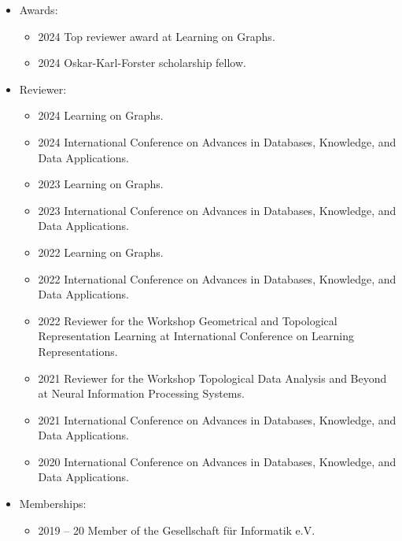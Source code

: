 \documentclass[a4paper, 11pt]{article}
\newcommand{\years}[1]{\marginnote{\scriptsize #1}}
\begin{document}
	\years{Service}
	\vspace{-10pt}
	\begin{itemize}[noitemsep, leftmargin=*]
		\item Awards:
			\begin{itemize}[noitemsep, leftmargin=*]
				\item 2024 Top reviewer award at Learning on Graphs.

				\item 2024 Oskar-Karl-Forster scholarship fellow.
			\end{itemize}

		\item Reviewer:
			\begin{itemize}[noitemsep, leftmargin=*]
				\item 2024 Learning on Graphs.

				\item 2024 International Conference on Advances in Databases, Knowledge,
					and Data Applications.

				\item 2023 Learning on Graphs.

				\item 2023 International Conference on Advances in Databases, Knowledge,
					and Data Applications.

				\item 2022 Learning on Graphs.

				\item 2022 International Conference on Advances in Databases, Knowledge,
					and Data Applications.

				\item 2022 Reviewer for the Workshop Geometrical and Topological Representation
					Learning at International Conference on Learning Representations.

				\item 2021 Reviewer for the Workshop Topological Data Analysis and Beyond
					at Neural Information Processing Systems.

				\item 2021 International Conference on Advances in Databases, Knowledge,
					and Data Applications.

				\item 2020 International Conference on Advances in Databases, Knowledge,
					and Data Applications.
			\end{itemize}

		\item Memberships:
			\begin{itemize}[noitemsep, leftmargin=*]
				\item 2019 -- 20 Member of the Gesellschaft für Informatik e.V.


\end{itemize}
\end{itemize}
\end{document}
